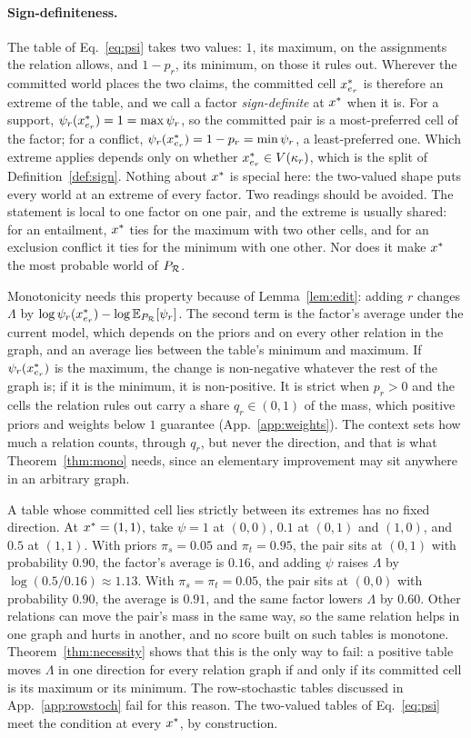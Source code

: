 \paragraph{Sign-definiteness.}
\label{app:signdef}
The table of Eq.~\ref{eq:psi} takes two values: $1$, its maximum, on the assignments the relation
allows, and $1-p_r$, its minimum, on those it rules out. Wherever the committed world places the
two claims, the committed cell $x^{\ast}_{e_r}$ is therefore an extreme of the table, and we call a
factor \emph{sign-definite} at $x^{\ast}$ when it is. For a support, $\psi_r(x^{\ast}_{e_r})=1=\max\psi_r$,
so the committed pair is a most-preferred cell of the factor; for a conflict,
$\psi_r(x^{\ast}_{e_r})=1-p_r=\min\psi_r$, a least-preferred one. Which extreme applies depends only on
whether $x^{\ast}_{e_r}\in V(\kappa_r)$, which is the split of Definition~\ref{def:sign}. Nothing about
$x^{\ast}$ is special here: the two-valued shape puts every world at an extreme of every factor. Two
readings should be avoided. The statement is local to one factor on one pair, and the extreme is
usually shared: for an entailment, $x^{\ast}$ ties for the maximum with two other cells, and for an
exclusion conflict it ties for the minimum with one other. Nor does it make $x^{\ast}$ the most
probable world of $P_{\mathcal{R}}$.

Monotonicity needs this property because of Lemma~\ref{lem:edit}: adding $r$ changes $\Lambda$ by
$\log\psi_r(x^{\ast}_{e_r})-\log\mathbb{E}_{P_{\mathcal{R}}}[\psi_r]$. The second term is the factor's average under the
current model, which depends on the priors and on every other relation in the graph, and an
average lies between the table's minimum and maximum. If $\psi_r(x^{\ast}_{e_r})$ is the maximum, the
change is non-negative whatever the rest of the graph is; if it is the minimum, it is
non-positive. It is strict when $p_r>0$ and the cells the relation rules out carry a share
$q_r\in(0,1)$ of the mass, which positive priors and weights below $1$ guarantee
(App.~\ref{app:weights}). The context sets how much a relation counts, through $q_r$, but never
the direction, and that is what Theorem~\ref{thm:mono} needs, since an elementary improvement may
sit anywhere in an arbitrary graph.

A table whose committed cell lies strictly between its extremes has no fixed direction. At
$x^{\ast}=(1,1)$, take $\psi=1$ at $(0,0)$, $0.1$ at $(0,1)$ and $(1,0)$, and $0.5$ at $(1,1)$. With
priors $\pi_s=0.05$ and $\pi_t=0.95$, the pair sits at $(0,1)$ with probability $0.90$, the
factor's average is $0.16$, and adding $\psi$ raises $\Lambda$ by $\log(0.5/0.16)\approx1.13$. With
$\pi_s=\pi_t=0.05$, the pair sits at $(0,0)$ with probability $0.90$, the average is $0.91$, and
the same factor lowers $\Lambda$ by $0.60$. Other relations can move the pair's mass in the same
way, so the same relation helps in one graph and hurts in another, and no score built on such
tables is monotone. Theorem~\ref{thm:necessity} shows that this is the only way to fail: a
positive table moves $\Lambda$ in one direction for every relation graph if and only if its
committed cell is its maximum or its minimum. The row-stochastic tables discussed in
App.~\ref{app:rowstoch} fail for this reason. The two-valued tables of Eq.~\ref{eq:psi} meet the
condition at every $x^{\ast}$, by construction.


